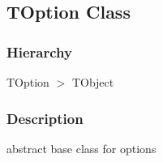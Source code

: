 \documentclass{report}
\begin{document}
\subsection*{TOption Class}
\fi
\label{PasDoc_OptionParser.TOption}
\subsubsection*{\large{\textbf{Hierarchy}}\normalsize\hspace{1ex}\hfill}
TOption {$>$} TObject
\subsubsection*{\large{\textbf{Description}}\normalsize\hspace{1ex}\hfill}
abstract base class for options\hfill\vspace*{1ex}
\end{document}
